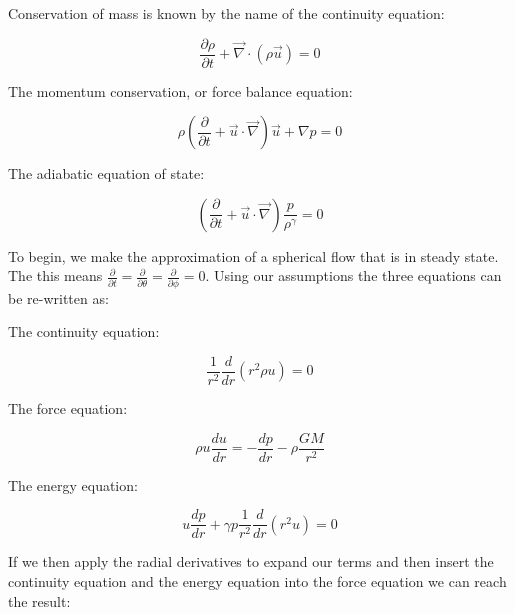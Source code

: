 \documentclass[%
 reprint,
 amsmath,amssymb,
 aps,
]{revtex4-1}
\begin{document}
Conservation of mass is known by the name of the continuity equation:

\begin{equation}
\frac{\partial \rho}{\partial t} + \vec{\nabla} \cdot (\rho \vec{u}) = 0 
\end{equation}

The momentum conservation, or force balance equation:

\begin{equation}
\rho \left( \frac{\partial}{\partial t} + \vec{u} \cdot \vec{\nabla} \right) \vec{u} + \nabla p = 0
\end{equation}

The adiabatic equation of state:

\begin{equation}
\left(\frac{\partial }{\partial t} + \vec{u} \cdot \vec{\nabla} \right) \frac{p}{\rho^{\gamma}} = 0  
\end{equation}

To begin, we make the approximation of a spherical flow that is in steady state. The this means $\displaystyle \frac{\partial}{\partial t} = \frac{\partial}{\partial \theta} = \frac{\partial}{\partial \phi} = 0$. %
Using our assumptions the three equations can be re-written as:

The continuity equation:

\begin{equation}
\frac{1}{r^2} \frac{d}{dr}(r^2 \rho u) = 0
\end{equation}

The force equation:

\begin{equation}
\rho u \frac{du}{dr} = -\frac{dp}{dr} - \rho \frac{GM}{r^2}
\end{equation}

The energy equation:  

\begin{equation}
u \frac{dp}{dr} + \gamma p \frac{1}{r^2}\frac{d}{dr} ( r^2 u) = 0
\end{equation}

If we then apply the radial derivatives to expand our terms and then insert the continuity equation and the energy equation into the force equation we can reach the result:
\end{document}
